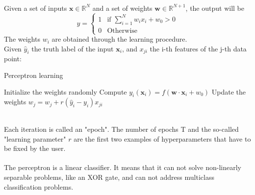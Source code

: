 \\
Given a set of inputs $\bm{x} \in \mathbb{R}^N$ and a set of weights $\bm{w} \in \mathbb{R}^{N+1}$, the output will be
\begin{equation}
    y=
    \begin{cases}
        1 & \text{if }\sum_{i=1}^N w_i x_i + w_0 >0\\
        0 & \text{Otherwise}
    \end{cases}
\end{equation}
The weights $w_i$ are obtained through the learning procedure.\\
Given $\hat{y}_i$ the truth label of the input $\bm{x}_i$, and $x_{ji}$ the i-th features of the j-th data point:\\
\begin{algorithm}
\caption{Perceptron learning}\label{algo:perceptron}
\begin{algorithmic}[1]
    \State Initialize the weights randomly
            \State Compute $y_i(\bm{x}_i)=f(\bm{w}\cdot \bm{x}_i+w_0)$
            \State Update the weights $w_j=w_j+r(\hat{y}_i-y_i)x_{ji}$
        \EndFor
    \EndFor
\end{algorithmic}
\end{algorithm}
\\
Each iteration is called an "epoch". The number of epochs T and the so-called "learning parameter" $r$ are the first two examples of hyperparameters that have to be fixed by the user.\\
\\
The perceptron is a linear classifier. It means that it can not solve non-linearly separable problems, like an XOR gate, and can not address multiclass classification problems.



